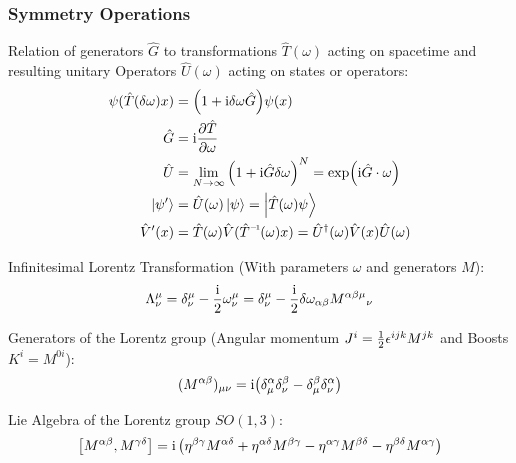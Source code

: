 		\subsubsection{Symmetry Operations}
			Relation of generators $\hat{G}$ to transformations $\hat{T}(\omega)$ acting on spacetime and resulting unitary Operators $\hat{U}(\omega)$ acting on states or operators:
			\begin{equation}
				\begin{aligned}
					\psi(\hat{T}(\delta \omega)x) &= \qty(1+ \i \delta\omega \hat{G}) \psi(x)\\
					\hat{G} &= \i \pdv{\hat{T}}{\omega} \\
					\hat{U} &= \lim_{N \to \infty} \qty(1+\i\hat{G}\delta\omega)^N = \exp(\i \hat{G} \cdot \omega) \\
					\Ket{\psi'} &= \hat{U}(\omega)\Ket{\psi} = \Ket{\hat{T}(\omega)\psi} \\
					\hat{V}'(x) &= \hat{T}(\omega) \hat{V}(\inv{\hat{T}}(\omega)x) = \hat{U}^\dagger(\omega) \hat{V}(x) \hat{U}(\omega) \\
				\end{aligned}
			\end{equation}

			\noindent
			Infinitesimal Lorentz Transformation (With parameters $\omega$ and generators $M$):
			\begin{equation}
				\begin{aligned}
					\Lambda^\mu_\nu &= \delta^\mu_\nu - \frac{\mathrm{i}}{2}\omega^\mu_\nu = \delta^\mu_\nu - \frac{\mathrm{i}}{2}\delta\omega_{\alpha\beta}M^{\alpha\beta\mu}{}_\nu \\
				\end{aligned}
			\end{equation}

			\noindent
			Generators of the Lorentz group (Angular momentum $J^i = \frac{1}{2}\epsilon^{ijk} M^{jk}$ and Boosts $K^i = M^{0i}$):
			\begin{equation}
				\begin{aligned}
					(M^{\alpha\beta})_{\mu\nu} &= \mathrm{i}\qty(\delta^{\alpha}_{\mu}\delta^{\beta}_{\nu} - \delta^{\beta}_{\mu}\delta^{\alpha}_\nu ) \\
				\end{aligned}
			\end{equation}

			\noindent
			Lie Algebra of the Lorentz group $SO(1,3)$:
			\begin{equation}
				\begin{aligned}
					\comm{M^{\alpha\beta}}{M^{\gamma\delta}} = \i \left(\eta^{\beta\gamma}M^{\alpha\delta}+\eta^{\alpha\delta}M^{\beta\gamma}-\eta^{\alpha\gamma}M^{\beta\delta}-\eta^{\beta\delta}M^{\alpha\gamma}\right)
				\end{aligned}
			\end{equation}

